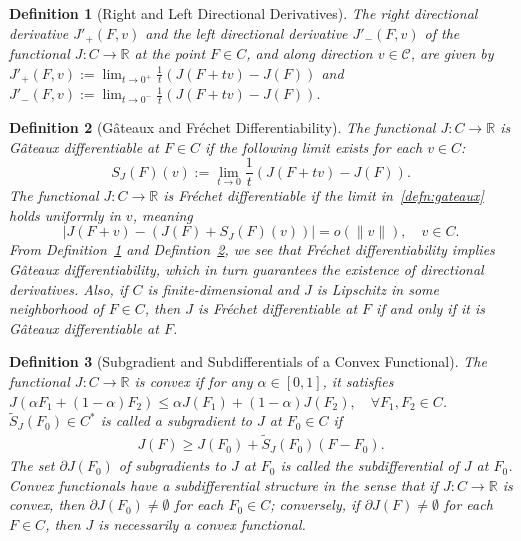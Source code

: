\documentclass[11pt,leqno]{amsart}
\newtheorem{definition}{Definition}
\begin{document}
\begin{definition}[Right and Left Directional Derivatives]\label{def:dirder} The \emph{right directional derivative} $J'_+(F,v)$ and the \emph{left directional derivative} $J'_{-}(F,v)$ of the functional $J: C \to \mathbb{R}$ at the point $F \in C$, and along direction $v \in \mathcal{C}$, are given by
$J'_+(F,v) := \lim_{t \to 0^+} \frac{1}{t}\left(J(F+tv) - J(F)\right)$ and
$J'_{-}(F,v) := \lim_{t \to 0^{-} } \frac{1}{t}\left(J(F+tv) - J(F)\right).$
\end{definition}

\begin{definition}[G\^{a}teaux and Fr\'{e}chet Differentiability]\label{def:gatfre} The functional $J: C \to \mathbb{R}$ is \emph{G\^{a}teaux differentiable} at $F \in C$ if the following limit exists for each $v \in C$:
\begin{equation}\label{defn:gateaux} S_J(F)(v) := \lim_{t \to 0} \frac{1}{t} \left( J(F+tv) - J(F)\right).\end{equation}
 The functional $J: C \to \mathbb{R}$ is \emph{Fr\'{e}chet differentiable} if the limit in~\eqref{defn:gateaux} holds uniformly in $v$, meaning $$| J(F+v) - (J(F) + S_J(F)(v))| = o(\|v\|), \quad v \in C.$$ From Definition~\ref{def:dirder} and Defintion~\ref{def:gatfre}, we see that Fr\'{e}chet differentiability implies G\^{a}teaux differentiability, which in turn guarantees the existence of  directional derivatives. Also, if $C$ is finite-dimensional and $J$ is Lipschitz in some neighborhood of $F \in C$, then $J$ is Fr\'{e}chet differentiable at $F$ if and only if it is G\^{a}teaux differentiable at $F$.
\end{definition}

\begin{definition}[Subgradient and Subdifferentials of a Convex Functional]\label{def:subgradsubdiff} 
The functional $J: C \to \mathbb{R}$ is \emph{convex} if for any $\alpha \in [0,1]$, it satisfies $J(\alpha F_1 + (1-\alpha)F_2) \leq \alpha J(F_1) + (1-\alpha)J(F_2), \quad \forall F_1,F_2 \in C$. $\tilde{S}_J(F_0) \in C^*$ is called a \emph{subgradient} to $J$ at $F_0 \in C$ if 
\begin{align}\label{eq:subgrad}
  J(F) \geq J(F_0) + \tilde{S}_J(F_0)(F-F_0).  
\end{align}
The set $\partial J(F_0)$ of subgradients to $J$ at $F_0$ is called the \emph{subdifferential} of $J$ at $F_0$. Convex functionals have a subdifferential structure in the sense that if $J:C \to \mathbb{R}$ is convex, then $\partial J(F_0) \neq \emptyset$ for each $F_0 \in C$; conversely,  if $\partial J(F) \neq \emptyset$ for each $F \in C$, then $J$ is necessarily a convex functional.
\end{definition}
\end{document}
